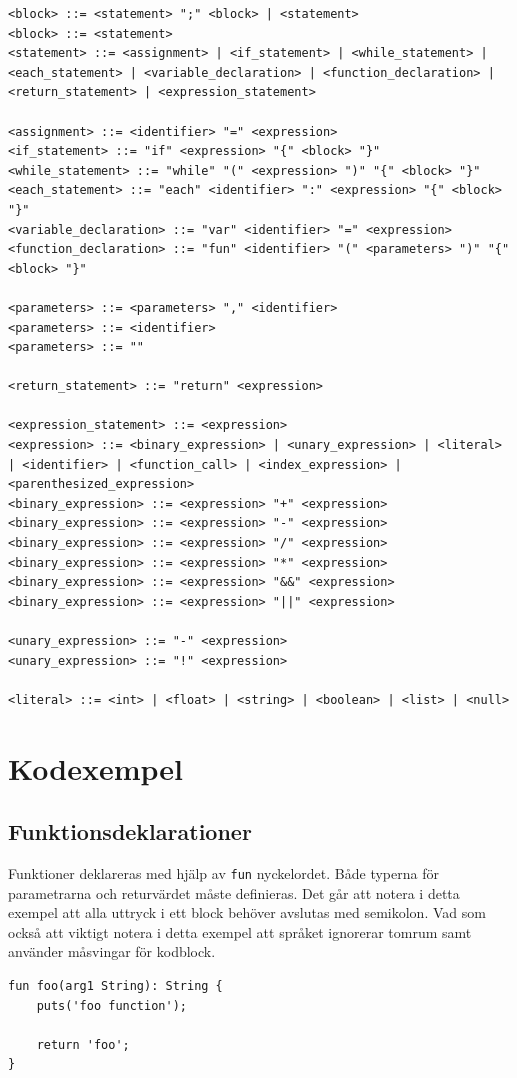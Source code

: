 \documentclass{TDP003mall}
\begin{document}
\begin{verbatim}
<block> ::= <statement> ";" <block> | <statement>
<block> ::= <statement>
<statement> ::= <assignment> | <if_statement> | <while_statement> | <each_statement> | <variable_declaration> | <function_declaration> | <return_statement> | <expression_statement>

<assignment> ::= <identifier> "=" <expression>
<if_statement> ::= "if" <expression> "{" <block> "}"
<while_statement> ::= "while" "(" <expression> ")" "{" <block> "}"
<each_statement> ::= "each" <identifier> ":" <expression> "{" <block> "}"
<variable_declaration> ::= "var" <identifier> "=" <expression>
<function_declaration> ::= "fun" <identifier> "(" <parameters> ")" "{" <block> "}"

<parameters> ::= <parameters> "," <identifier>
<parameters> ::= <identifier>
<parameters> ::= ""

<return_statement> ::= "return" <expression>

<expression_statement> ::= <expression>
<expression> ::= <binary_expression> | <unary_expression> | <literal> | <identifier> | <function_call> | <index_expression> | <parenthesized_expression>
<binary_expression> ::= <expression> "+" <expression>
<binary_expression> ::= <expression> "-" <expression>
<binary_expression> ::= <expression> "/" <expression>
<binary_expression> ::= <expression> "*" <expression>
<binary_expression> ::= <expression> "&&" <expression>
<binary_expression> ::= <expression> "||" <expression>

<unary_expression> ::= "-" <expression>
<unary_expression> ::= "!" <expression>

<literal> ::= <int> | <float> | <string> | <boolean> | <list> | <null>
\end{verbatim}

\newpage
\section{Kodexempel}
\subsection{Funktionsdeklarationer}
Funktioner deklareras med hjälp av \texttt{fun} nyckelordet. Både typerna för parametrarna och returvärdet måste definieras. Det går att notera i detta exempel att alla uttryck i ett block behöver avslutas med semikolon. Vad som också att viktigt notera i detta exempel att språket ignorerar tomrum samt använder måsvingar för kodblock.
\begin{verbatim}
fun foo(arg1 String): String {
    puts('foo function');

    return 'foo';
}
\end{verbatim}
\end{document}
